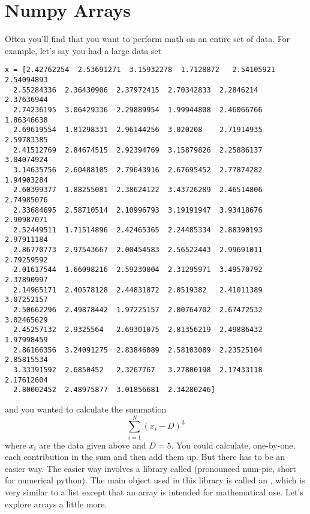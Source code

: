 \section{Numpy Arrays}
Often you'll find that you want to perform math on an entire set of
data.  For example, let's say you had a large data set
\begin{Verbatim}
x = [2.42762254  2.53691271  3.15932278  1.7128872   2.54105921  2.54094893
  2.55284336  2.36430906  2.37972415  2.70342833  2.2846214   2.37636944
  2.74236195  3.06429336  2.29889954  1.99944808  2.46066766  1.86346638
  2.69619554  1.81298331  2.96144256  3.020208    2.71914935  2.59783385
  2.41512769  2.84674515  2.92394769  3.15879826  2.25886137  3.04074924
  3.14635756  2.60488105  2.79643916  2.67695452  2.77874282  1.94903284
  2.60399377  1.88255081  2.38624122  3.43726289  2.46514806  2.74985076
  2.33684695  2.58710514  2.10996793  3.19191947  3.93418676  2.90987071
  2.52449511  1.71514896  2.42465365  2.24485334  2.88390193  2.97911184
  2.86770773  2.97543667  2.00454583  2.56522443  2.99691011  2.79259592
  2.01617544  1.66098216  2.59230004  2.31295971  3.49570792  2.37890997
  2.14965171  2.40578128  2.44831872  2.0519382   2.41011389  3.07252157
  2.50662296  2.49878442  1.97225157  2.00764702  2.67472532  3.02465629
  2.45257132  2.9325564   2.69301075  2.81356219  2.49886432  1.97998459
  2.86166356  3.24091275  2.83846089  2.58103089  2.23525104  2.85815534
  3.33391592  2.6850452   2.3267767   3.27800198  2.17433118  2.17612604
  2.80002452  2.48975877  3.01856681  2.34280246]
\end{Verbatim}
and you wanted to calculate the summation
\begin{equation}
\sum_{i=1}^N (x_i - D)^3
\end{equation}
where $x_i$ are the data given above and $D = 5$.  You could
calculate, one-by-one, each contribution in the sum and then add them
up.  But there has to be an easier way.  The easier way involves a
library called  (pronounced num-pie, short for numerical
python).  The main object used in this library is called an
, which is very similar to a list except that an array
is intended for mathematical use.  Let's explore arrays a little more.

